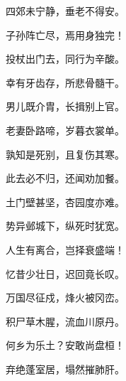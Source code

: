 \documentclass[12pt,UTF-8,openany,fontset=none]{ctexbook}
\begin{document}
    \vspace{18pt}  %

\begin{center}
    \begin{Large}

        四郊未宁静，垂老不得安。

        子孙阵亡尽，焉用身独完！

        投杖出门去，同行为辛酸。

        幸有牙齿存，所悲骨髓干。

        男儿既介胄，长揖别上官。

        老妻卧路啼，岁暮衣裳单。

        孰知是死别，且复伤其寒。

        此去必不归，还闻劝加餐。

        土门壁甚坚，杏园度亦难。

        势异邺城下，纵死时犹宽。

        人生有离合，岂择衰盛端！

        忆昔少壮日，迟回竟长叹。

        万国尽征戍，烽火被冈峦。

        积尸草木腥，流血川原丹。

        何乡为乐土？安敢尚盘桓！

        弃绝蓬室居，塌然摧肺肝。

    \end{Large}

\end{center}

\vspace{8pt}
\clearpage
\end{document}
